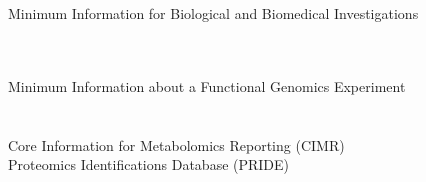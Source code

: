 \begin{frame}{}
{\begin{center}
\begin{minipage}{.9\textwidth}
{\begin{minipage}{\textwidth}
\begin{lightquadblock}{Minimum Information for Biological and Biomedical Investigations}
\begin{center}
\begin{minipage}{.99\textwidth}
{\begin{itemize}
{\\
{\vspace*{-11pt}\resizebox{4}{!}{\textcolor{white}{ABC}}}\\
{\vsp}\hspace*{5pt}{\MyOct}\hspace{-4pt} Minimum Information about a Functional Genomics Experiment\\%

\\
{\vspace*{-11pt}\resizebox{4}{!}{\textcolor{white}{ABC}}}\\
{\vsp}\hspace*{5pt}{\MyOct}\hspace{-4pt} Core Information for Metabolomics Reporting (CIMR)\\
{\vsp}\hspace*{5pt}{\MyOct}\hspace{-4pt} Proteomics Identifications Database (PRIDE)\\
} \\
\\\vspace{1em}
\end{itemize}}\end{minipage}
\vspace{-1em}
\end{center}
\end{lightquadblock}
\end{minipage}}


\end{minipage}
\end{center}
}

\end{frame}


